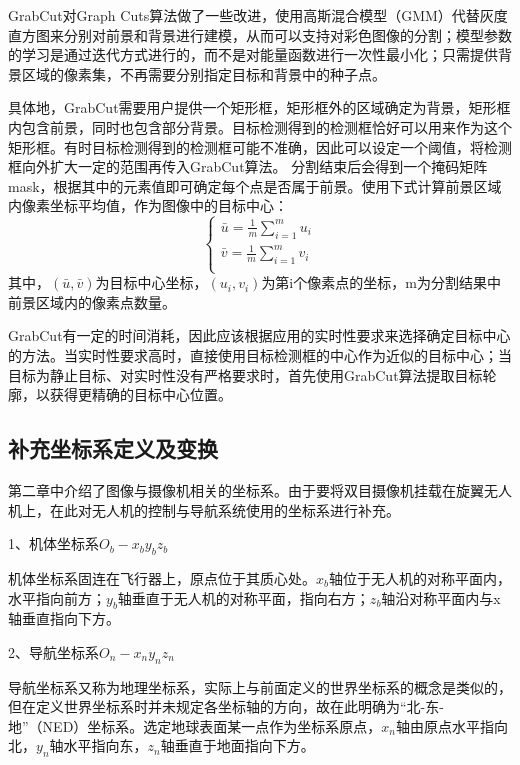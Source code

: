 GrabCut对Graph Cuts算法做了一些改进，使用高斯混合模型（GMM）代替灰度直方图来分别对前景和背景进行建模，从而可以支持对彩色图像的分割；模型参数的学习是通过迭代方式进行的，而不是对能量函数进行一次性最小化；只需提供背景区域的像素集，不再需要分别指定目标和背景中的种子点。

具体地，GrabCut需要用户提供一个矩形框，矩形框外的区域确定为背景，矩形框内包含前景，同时也包含部分背景。目标检测得到的检测框恰好可以用来作为这个矩形框。有时目标检测得到的检测框可能不准确，因此可以设定一个阈值，将检测框向外扩大一定的范围再传入GrabCut算法。
分割结束后会得到一个掩码矩阵mask，根据其中的元素值即可确定每个点是否属于前景。使用下式计算前景区域内像素坐标平均值，作为图像中的目标中心：
\begin{equation}
\left\{
\begin{array}{l}
\bar{u} = \frac{1}{m}\sum\limits_{i=1}^{m}u_i \\
\bar{v} = \frac{1}{m}\sum\limits_{i=1}^{m}v_i \\
\end{array}
\right.
\end{equation}
其中，$(\bar{u}, \bar{v})$为目标中心坐标，$(u_i, v_i)$为第i个像素点的坐标，m为分割结果中前景区域内的像素点数量。


GrabCut有一定的时间消耗，因此应该根据应用的实时性要求来选择确定目标中心的方法。当实时性要求高时，直接使用目标检测框的中心作为近似的目标中心；当目标为静止目标、对实时性没有严格要求时，首先使用GrabCut算法提取目标轮廓，以获得更精确的目标中心位置。

\subsection{补充坐标系定义及变换} %
第二章中介绍了图像与摄像机相关的坐标系。由于要将双目摄像机挂载在旋翼无人机上，在此对无人机的控制与导航系统使用的坐标系进行补充。

1、机体坐标系$O_b-x_by_bz_b$

机体坐标系固连在飞行器上，原点位于其质心处。$x_b$轴位于无人机的对称平面内，水平指向前方；$y_b$轴垂直于无人机的对称平面，指向右方；$z_b$轴沿对称平面内与x轴垂直指向下方。

2、导航坐标系$O_n-x_ny_nz_n$

导航坐标系又称为地理坐标系，实际上与前面定义的世界坐标系的概念是类似的，但在定义世界坐标系时并未规定各坐标轴的方向，故在此明确为“北-东-地”（NED）坐标系。选定地球表面某一点作为坐标系原点，$x_n$轴由原点水平指向北，$y_n$轴水平指向东，$z_n$轴垂直于地面指向下方。

